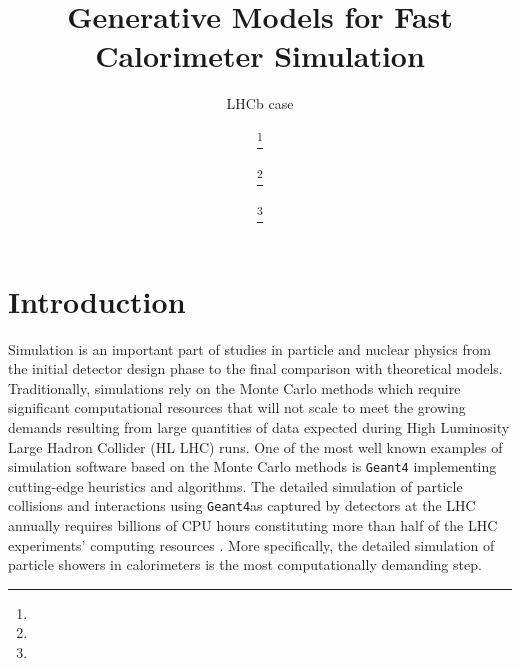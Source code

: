 \documentclass{webofc}
\newcommand{\geant}{{\texttt{Geant4}}}
\begin{document}
\title{Generative Models for Fast Calorimeter Simulation}
\subtitle{LHCb case}

\author{
   \fnsep\thanks{}
\and
      \fnsep\thanks{}
\and
      
\and
       
\and
       
\and
       \fnsep\thanks{}
}

        


\maketitle

\section{Introduction}
Simulation is an important part of studies in particle and nuclear physics from the initial detector design phase to the final comparison with theoretical models. Traditionally, simulations rely on the Monte Carlo methods which require significant computational resources that will not scale to meet the growing demands resulting from large quantities of data expected during High Luminosity Large Hadron Collider (HL LHC) runs. One of the most well known examples of simulation software based on the Monte Carlo methods is \geant \cite{agostinelli2003geant4} implementing cutting-edge heuristics and algorithms. The detailed simulation of particle collisions and interactions using \geant as captured by detectors at the LHC annually requires billions of CPU hours constituting more than half of the LHC experiments' computing resources \cite{bozzi2014, flynn2015computing}. More specifically, the detailed simulation of particle showers in calorimeters is the most computationally demanding step.
\end{document}
